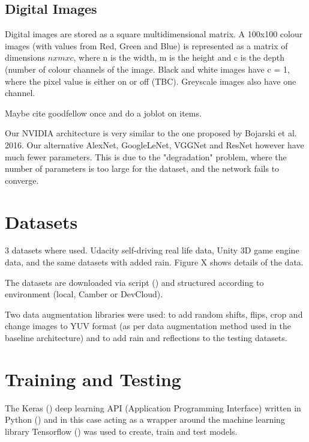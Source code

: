 \subsection{Digital Images}
Digital images are stored as a square multidimensional matrix. A 100x100 colour images (with values from Red, Green and Blue) is represented as a matrix of dimensions $n x m x c$, where n is the width, m is the height and c is the depth (number of colour channels of the image. Black and white images have c = 1, where the pixel value is either on or off (TBC). Greyscale images also have one channel.

Maybe cite goodfellow once and do a joblot on items.  

Our NVIDIA architecture is very similar to the one proposed by Bojarski et al. 2016. Our alternative AlexNet, GoogleLeNet, VGGNet and ResNet however have much fewer parameters. This is due to the "degradation" problem, where the number of parameters is too large for the dataset, and the network fails to converge.

\section{Datasets}
3 datasets where used. Udacity self-driving real life data, Unity 3D game engine data, and the same datasets with added rain. Figure X shows details of the data.

The datasets are downloaded via script (\cite{Sikar2020}) and structured according to environment (local, Camber or DevCloud).

Two data augmentation libraries were used: \cite{Naoki2016} to add random shifts, flips, crop and change images to YUV format (as per \cite{bojarski2016end} data augmentation method used in the baseline architecture) and \cite{Saxena2017} to add rain and reflections to the testing datasets.

\section{Training and Testing}

The Keras (\cite{chollet2015keras}) deep learning API (Application Programming Interface) written in Python (\cite{van1995python}) and in this case acting as a wrapper around the machine learning library Tensorflow (\cite{abadi2016tensorflow})  was used to create, train and test models.

